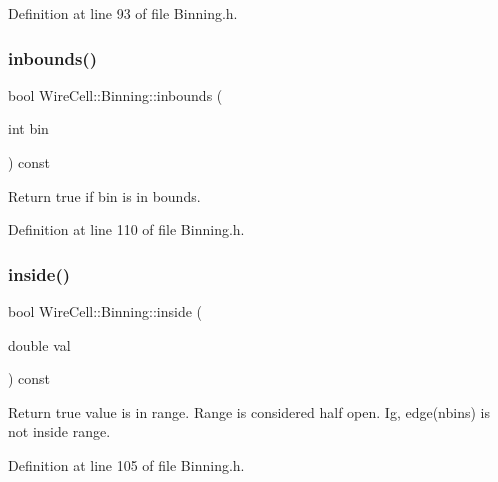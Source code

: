 Definition at line 93 of file Binning.\+h.

\mbox{\label{class_wire_cell_1_1_binning_aa3696d13f4a4dc658d47c430663dc78e}} 
\subsubsection{\texorpdfstring{inbounds()}{inbounds()}}
{\footnotesize\ttfamily bool Wire\+Cell\+::\+Binning\+::inbounds (\begin{DoxyParamCaption}\item[{int}]{bin }\end{DoxyParamCaption}) const\hspace{0.3cm}{\ttfamily [inline]}}



Return true if bin is in bounds. 



Definition at line 110 of file Binning.\+h.

\mbox{\label{class_wire_cell_1_1_binning_a251f5ec35ccc3ddb07326ad6f512a0bd}} 
\subsubsection{\texorpdfstring{inside()}{inside()}}
{\footnotesize\ttfamily bool Wire\+Cell\+::\+Binning\+::inside (\begin{DoxyParamCaption}\item[{double}]{val }\end{DoxyParamCaption}) const\hspace{0.3cm}{\ttfamily [inline]}}

Return true value is in range. Range is considered half open. Ig, edge(nbins) is not inside range. 

Definition at line 105 of file Binning.\+h.

\mbox{\label{class_wire_cell_1_1_binning_ac3c24a2ebbe3c1db7f109b8cf1a69446}} 
